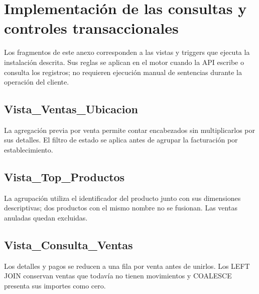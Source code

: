\documentclass[10pt,letterpaper]{article}
\begin{document}
\clearpage\appendix\section{Implementación de las consultas y controles transaccionales}

Los fragmentos de este anexo corresponden a las vistas y triggers que ejecuta la instalación descrita. Sus reglas se aplican en el motor cuando la API escribe o consulta los registros; no requieren ejecución manual de sentencias durante la operación del cliente.

\par\medskip\noindent\begin{minipage}{\textwidth}\subsection{Vista\_Ventas\_Ubicacion}

La agregación previa por venta permite contar encabezados sin multiplicarlos por sus detalles. El filtro de estado se aplica antes de agrupar la facturación por establecimiento.



\end{minipage}\par\medskip

\par\medskip\noindent\begin{minipage}{\textwidth}\subsection{Vista\_Top\_Productos}

La agrupación utiliza el identificador del producto junto con sus dimensiones descriptivas; dos productos con el mismo nombre no se fusionan. Las ventas anuladas quedan excluidas.



\end{minipage}\par\medskip

\par\medskip\noindent\begin{minipage}{\textwidth}\subsection{Vista\_Consulta\_Ventas}

Los detalles y pagos se reducen a una fila por venta antes de unirlos. Los LEFT JOIN conservan ventas que todavía no tienen movimientos y COALESCE presenta sus importes como cero.



\end{minipage}\par\medskip
\end{document}

